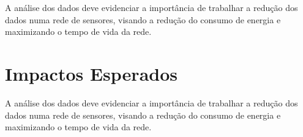 
\lettrine{A}{} análise dos dados deve evidenciar a importância de trabalhar a redução dos dados numa rede de sensores, visando a redução do consumo de energia e maximizando o tempo de vida da rede.


\section{Impactos Esperados}
A análise dos dados deve evidenciar a importância de trabalhar a redução dos dados numa rede de sensores, visando a redução do consumo de energia e maximizando o tempo de vida da rede.




